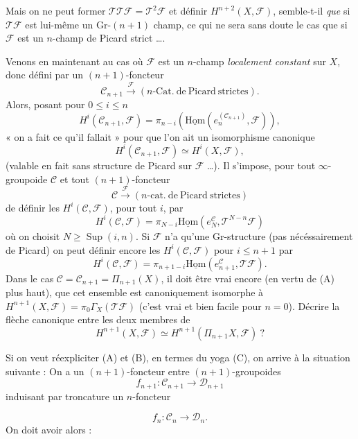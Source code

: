 \documentclass[11pt,a4paper]{article}
\begin{document}
Mais on ne peut former $\mathcal{T}\mathcal{T}\mathcal{F} = \mathcal{T}^2\mathcal{F}$ et définir $H^{n+2}(X, \mathcal{F})$, semble-t-il \emph{que} si $\mathcal{T}\mathcal{F}$ est lui-même un Gr-$(n+1)$ champ, ce qui ne sera sans doute le cas que si $\mathcal{F}$ est un $n$-champ de Picard strict ….

Venons en maintenant au cas où $\mathcal{F}$ est un $n$-champ \emph{localement constant} sur $X$, donc défini par un $(n+1)$-foncteur
\[
\mathcal{C}_{n+1} \xrightarrow{\ \mathcal{F}\ } (n\text{-}\mathrm{Cat.\ de\ Picard\ strictes}).
\]
Alors, posant pour $0 \leqslant i \leqslant n$
\[
H^i(\mathcal{C}_{n+1}, \mathcal{F}) = \pi_{n-i}(\underline{\mathrm{Hom}}(e^{(\mathcal{C}_{n+1})}_n, \mathcal{F})),
\]
« on a fait ce qu'il fallait » pour que l'on ait un isomorphisme canonique
\[
H^i(\mathcal{C}_{n+1}, \mathcal{F}) \simeq H^i(X, \mathcal{F}),
\]
(valable en fait sans structure de Picard sur $\mathcal{F}$ …). Il s'impose, pour tout $\infty$-groupoide $\mathcal{C}$ et tout $(n+1)$-foncteur
\[
\mathcal{C} \xrightarrow{\ \mathcal{F}\ } (n\text{-}\mathrm{cat.\ de\ Picard\ strictes})
\]
de définir les $H^i(\mathcal{C}, \mathcal{F})$, pour tout $i$, par
\[
H^i(\mathcal{C}, \mathcal{F}) = \pi_{N-i}\underline{\mathrm{Hom}}(e^{\mathcal{C}}_N, \mathcal{T}^{N-n}\mathcal{F})
\]
où on choisit $N \geqslant \operatorname{Sup}(i, n)$. Si $\mathcal{F}$ n'a qu'une Gr-structure (pas nécéssairement de Picard) on peut définir encore les $H^i(\mathcal{C}, \mathcal{F})$ pour $i \leqslant n+1$ par
\[
H^i(\mathcal{C}, \mathcal{F}) = \pi_{n+1-i}\underline{\mathrm{Hom}}(e^{\mathcal{C}}_{n+1}, \mathcal{T}\mathcal{F}).
\]
Dans le cas $\mathcal{C} = \mathcal{C}_{n+1} = \Pi_{n+1}(X)$, il doit être vrai encore (en vertu de (A) plus haut), que cet ensemble est canoniquement isomorphe à $H^{n+1}(X, \mathcal{F}) = \pi_0\Gamma_X(\mathcal{T}\mathcal{F})$ (c'est vrai et bien facile pour $n = 0$). Décrire la flèche canonique entre les deux membres de
\[
H^{n+1}(X, \mathcal{F}) \simeq H^{n+1}(\Pi_{n+1}X, \mathcal{F}) \ ?
\]

Si on veut réexpliciter (A) et (B), en termes du yoga (C), on arrive à la situation suivante :
On a un $(n+1)$-foncteur entre $(n+1)$-groupoides
\[
f_{n+1}\colon \mathcal{C}_{n+1} \to \mathcal{D}_{n+1}
\]
induisant par troncature un $n$-foncteur

\[
f_n\colon \mathcal{C}_n \to \mathcal{D}_n .
\]
On doit avoir alors :
\end{document}
